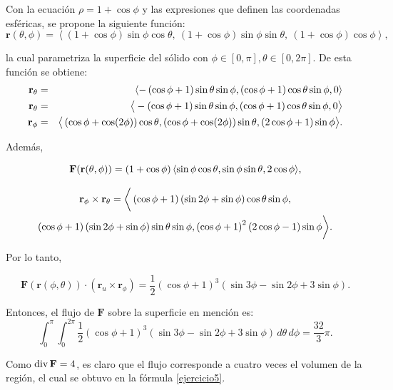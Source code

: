 \begin{parrafonumerado}
Con la ecuación \(\rho = 1 + \cos \phi\) y las expresiones que definen las coordenadas esféricas, se propone la siguiente función:
\[
\mathbf{r}(\theta,\phi) =
\left\langle
(1 + \cos \phi)\sin \phi \cos \theta,\
(1 + \cos \phi)\sin \phi \sin \theta,\
(1 + \cos \phi)\cos \phi
\right\rangle\!,
\]

la cual parametriza la superficie del sólido con $\phi \in[0,\pi], \theta\in[0,2\pi]$.
De esta función se obtiene:
{\small
\begin{eqnarray*}
{\bf r}_{\theta} &=& \left\langle -\left(\cos\phi +1\right)\sin\theta\sin\phi,(\cos \phi +1)\cos\theta\sin\phi,0\right\rangle \\
{\bf r}_{\theta } &=& \big \langle -\left(\cos\phi +1\right)\sin\theta\sin\phi,(\cos \phi +1)\cos\theta\sin\phi, 0 \big\rangle \\
{\bf r}_{\phi } &=& \big\langle \left( \cos \phi +\cos (2\phi) \right)\cos \theta , \left( \cos \phi +\cos (2\phi) \right)\sin \theta,
\left( 2\cos \phi +1\right)\sin \phi\big \rangle. \\
\end{eqnarray*}
}

Además,
{\small
\[{\bf F}({\bf r}(\theta,\phi))=(1+\cos\phi) \left\langle\sin\phi\cos\theta,\sin\phi\sin\theta,2\cos\phi\right\rangle\!,\]

\begin{multline*}
{\bf r}_{\phi}\times {\bf r}_{\theta}=\bigg\langle\left(\cos\phi+1\right)\left(\sin2\phi+\sin\phi\right)\cos\theta\sin \phi,\\
\left( \cos \phi +1\right) \left( \sin 2\phi +\sin \phi \right) \sin \theta \sin \phi ,\left( \cos \phi +1\right)
^{2}\left( 2\cos \phi -1\right) \sin \phi \bigg\rangle .
\end{multline*}
}

Por lo tanto,

\[
\mathbf{F}(\mathbf{r}(\phi,\theta)) \cdot (\mathbf{r}_{u} \times \mathbf{r}_{\phi}) =
\frac{1}{2}(\cos \phi + 1)^{3} \left( \sin 3\phi - \sin 2\phi + 3\sin \phi \right)\!.
\]

Entonces, el flujo de \(\mathbf{F}\) sobre la superficie en mención es:
{\small
\[
\int_{0}^{\pi} \int_{0}^{2\pi}
\frac{1}{2}(\cos \phi + 1)^{3} \left( \sin 3\phi - \sin 2\phi + 3\sin \phi \right)
\, d\theta\, d\phi = \frac{32}{3}\pi.
\]
}

Como ${\rm div\,}{\bf F} =4$, es claro que el flujo corresponde a cuatro veces el volumen de la región, el cual se obtuvo en la fórmula \ref{ejercicio5}.


\end{parrafonumerado}
